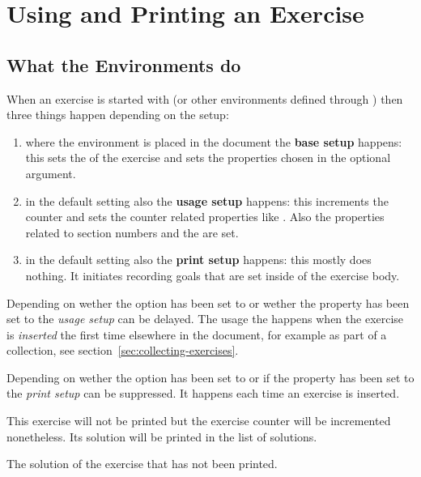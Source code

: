 \documentclass{xsim-manual}
\begin{document}
\section{Using and Printing an Exercise}\label{sec:using-printing}
\subsection{What the Environments do}

When an exercise is started with  (or other environments
defined through ) then three things happen depending
on the setup:
\begin{enumerate}
  \item where the environment is placed in the document the \textbf{base
      setup} happens: this sets the  of the exercise and sets the
    properties chosen in the optional argument.
  \item in the default setting also the \textbf{usage setup} happens: this
    increments the counter and sets the counter related properties like
    . Also the properties related to section numbers and the
     are set.
  \item in the default setting also the \textbf{print setup} happens: this
    mostly does nothing.  It initiates recording goals that are set inside of
    the exercise body.
\end{enumerate}

Depending on wether the option \code{/} has been
set to  or wether the property  has been set to
 the \emph{usage setup} can be delayed.  The usage the happens
when the exercise is \emph{inserted} the first time elsewhere in the document,
for example as part of a collection, see
section~\vref{sec:collecting-exercises}.

Depending on wether the option \code{/} has
been set to  or if the property  has been set to
 the \emph{print setup} can be suppressed.  It happens each time
an exercise is inserted.

\begin{example}
  \begin{exercise}[print=false,ID=invisible]
    This exercise will not be printed but the exercise counter will be
    incremented nonetheless. Its solution will be printed in the list of
    solutions.
  \end{exercise}
  \begin{solution}
    The solution of the exercise that has not been printed.
  \end{solution}
\end{example}
\end{document}
